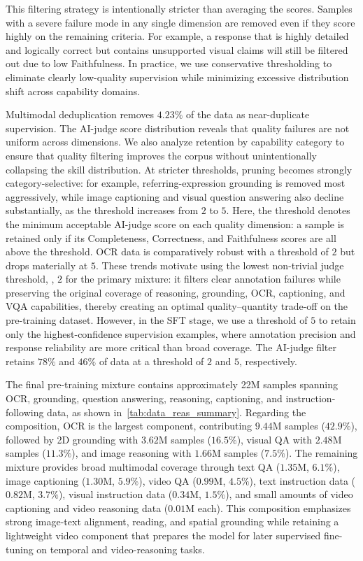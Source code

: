 This filtering strategy is intentionally stricter than averaging the scores. Samples with a severe failure mode in any single dimension are removed even if they score highly on the remaining criteria. For example, a response that is highly detailed and logically correct but contains unsupported visual claims will still be filtered out due to low Faithfulness. In practice, we use conservative thresholding to eliminate clearly low-quality supervision while minimizing excessive distribution shift across capability domains.

Multimodal deduplication removes $4.23\%$ of the data as near-duplicate supervision. The AI-judge score distribution reveals that quality failures are not uniform across dimensions. We also analyze retention by capability category to ensure that quality filtering improves the corpus without unintentionally collapsing the skill distribution. At stricter thresholds, pruning becomes strongly category-selective: for example, referring-expression grounding is removed most aggressively, while image captioning and visual question answering also decline substantially, as the threshold increases from $2$ to $5$. Here, the threshold denotes the minimum acceptable AI-judge score on each quality dimension: a sample is retained only if its Completeness, Correctness, and Faithfulness scores are all above the threshold. OCR data is comparatively robust with a threshold of $2$ but drops materially at $5$. These trends motivate using the lowest non-trivial judge threshold, \ie, $2$ for the primary mixture: it filters clear annotation failures while preserving the original coverage of reasoning, grounding, OCR, captioning, and VQA capabilities, thereby creating an optimal quality--quantity trade-off on the pre-training dataset. However, in the SFT stage, we use a threshold of $5$ to retain only the highest-confidence supervision examples, where annotation precision and response reliability are more critical than broad coverage. The AI-judge filter retains $78\%$ and $46\%$ of data at a threshold of $2$ and $5$, respectively.

The final pre-training mixture contains approximately 22M samples spanning OCR, grounding, question answering, reasoning, captioning, and instruction-following data, as shown in~\cref{tab:data_reas_summary}. Regarding the composition, OCR is the largest component, contributing $9.44$M samples ($42.9\%$), followed by 2D grounding with $3.62$M samples ($16.5\%$), visual QA with $2.48$M samples ($11.3\%$), and image reasoning with $1.66$M samples ($7.5\%$). The remaining mixture provides broad multimodal coverage through text QA ($1.35$M, $6.1\%$), image captioning ($1.30$M, $5.9\%$), video QA ($0.99$M, $4.5\%$), text instruction data ($0.82$M, $3.7\%$), visual instruction data ($0.34$M, $1.5\%$), and small amounts of video captioning and video reasoning data ($0.01$M each). This composition emphasizes strong image-text alignment, reading, and spatial grounding while retaining a lightweight video component that prepares the model for later supervised fine-tuning on temporal and video-reasoning tasks.


